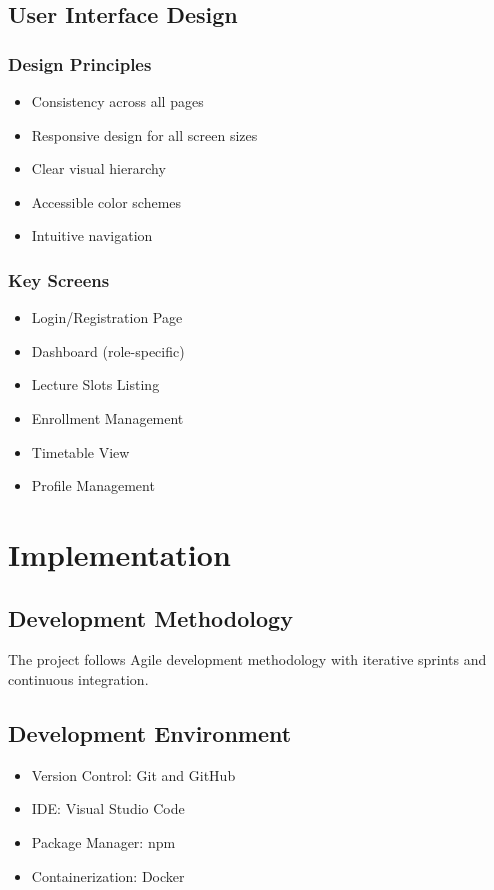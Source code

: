 \documentclass[12pt,a4paper]{report}
\begin{document}
\section{User Interface Design}

\subsection{Design Principles}
\begin{itemize}[leftmargin=*]
    \item Consistency across all pages
    \item Responsive design for all screen sizes
    \item Clear visual hierarchy
    \item Accessible color schemes
    \item Intuitive navigation
\end{itemize}

\subsection{Key Screens}
\begin{itemize}[leftmargin=*]
    \item Login/Registration Page
    \item Dashboard (role-specific)
    \item Lecture Slots Listing
    \item Enrollment Management
    \item Timetable View
    \item Profile Management
\end{itemize}

\chapter{Implementation}

\section{Development Methodology}
The project follows Agile development methodology with iterative sprints and continuous integration.

\section{Development Environment}
\begin{itemize}[leftmargin=*]
    \item Version Control: Git and GitHub
    \item IDE: Visual Studio Code
    \item Package Manager: npm
    \item Containerization: Docker
\end{itemize}
\end{document}
